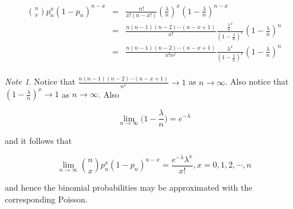 \documentclass[12pt,a4paper]{article}
\theoremstyle{regla}
\theoremstyle{remark}
\newtheorem{notes}{Note}[section]
\theoremstyle{definition}
\theoremstyle{nonumberbreak}
\begin{document}
\begin{eqnarray}
\binom{n}{x}p_n^x(1-p_n)^{n-x}& = &\frac{n!}{x!(n-x!)} \left ( \frac{\lambda}{n} \right )^x \left ( 1-\frac{\lambda}{n} \right )^{n-x}\\
& = &\frac{n(n-1)(n-2)\cdots (n-x+1)}{x!} \frac{\frac{\lambda}{n}^x}{\left ( 1-\frac{\lambda}{n} \right ) ^x} \left ( 1-\frac{\lambda}{n} \right )^n\\
& = &\frac{n(n-1)(n-2)\cdots (n-x+1)}{x!n^x} \frac{\lambda^x}{\left ( 1-\frac{\lambda}{n} \right ) ^x} \left ( 1-\frac{\lambda}{n} \right )^n\\
\end{eqnarray}
\begin{notes}
Notice that $\frac{n(n-1)(n-2)\cdots (n-x+1)}{n^x}\to 1$ as $n\to\infty$. Also notice that $(1-\frac{\lambda}{n})^x\to 1$ as $n\to\infty$. Also

$$\lim_{n \to \infty} \bigg( 1-\frac{\lambda}{n} \bigg) = e^{- \lambda}$$

 

and it follows that

$$ \lim_{n \to \infty} \binom{n}{x}p_n^x(1-p_n)^{n-x} = \frac{e^{- \lambda} \lambda^x}{x!}, x= 0,1,2, \cdots , n $$

and hence the binomial probabilities may be approximated with the corresponding Poisson.   
\end{notes}
\end{document}
